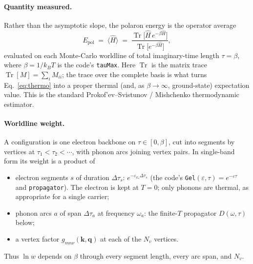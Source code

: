 \documentclass[11pt]{article}
\newcommand{\kv}{\mathbf{k}}
\newcommand{\qv}{\mathbf{q}}
\begin{document}
\paragraph{Quantity measured.}
Rather than the asymptotic slope, the polaron energy is the operator average
\begin{equation}
  E_{\mathrm{pol}} \;=\; \langle \hat H\rangle
  \;=\; \frac{\operatorname{Tr}\!\bigl[\hat H\,e^{-\beta\hat H}\bigr]}
             {\operatorname{Tr}\!\bigl[e^{-\beta\hat H}\bigr]},
  \label{eq:thermo}
\end{equation}
evaluated on each Monte-Carlo worldline of total imaginary-time length $\tau=\beta$, where $\beta=1/k_{B}T$ is the code's \texttt{tauMax}. Here $\operatorname{Tr}$ is the matrix trace $\operatorname{Tr}[M]=\sum_{i}M_{ii}$; the trace over the complete basis is what turns Eq.~\eqref{eq:thermo} into a proper thermal (and, as $\beta\to\infty$, ground-state) expectation value. This is the standard Prokof'ev--Svistunov / Mishchenko thermodynamic estimator.

\paragraph{Worldline weight.}
A configuration is one electron backbone on $\tau\in[0,\beta]$, cut into segments by
vertices at $\tau_{1}<\tau_{2}<\cdots$, with phonon arcs joining vertex pairs. In
single-band form its weight is a product of
\begin{itemize}
  \item electron segments $s$ of duration $\Delta\tau_{s}$: $e^{-\varepsilon_{k_{s}}\Delta\tau_{s}}$
    (the code's \texttt{Gel}$(\varepsilon,\tau)=e^{-\varepsilon\tau}$ and \texttt{propagator}).
    The electron is kept at $T=0$; only phonons are thermal, as appropriate for a single carrier;
  \item phonon arcs $a$ of span $\Delta\tau_{a}$ at frequency $\omega_{a}$: the finite-$T$
    propagator $D(\omega,\tau)$ below;
  \item a vertex factor $g_{mn\nu}(\kv,\qv)$ at each of the $N_{v}$ vertices.
\end{itemize}
Thus $\ln w$ depends on $\beta$ through every segment length, every arc span, and $N_{v}$.
\end{document}
